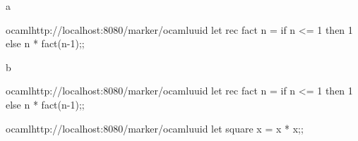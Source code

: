 


    \begin{question}{1}
        \begin{subquestion}{a}
            \begin{automarkable}{ocaml}{http://localhost:8080/marker/ocaml}{uuid}
                let rec fact n =
                  if n <= 1 then 1 else n * fact(n-1);;
            \end{automarkable}
        \end{subquestion}
        \begin{subquestion}{b}
            \begin{automarkable}{ocaml}{http://localhost:8080/marker/ocaml}{uuid}
                let rec fact n =
                  if n <= 1 then 1 else n * fact(n-1);;
            \end{automarkable}
        \end{subquestion}
    \end{question}

    \begin{question}{2}
        \begin{automarkable}{ocaml}{http://localhost:8080/marker/ocaml}{uuid}
            let square x = x * x;;
        \end{automarkable}
    \end{question}
